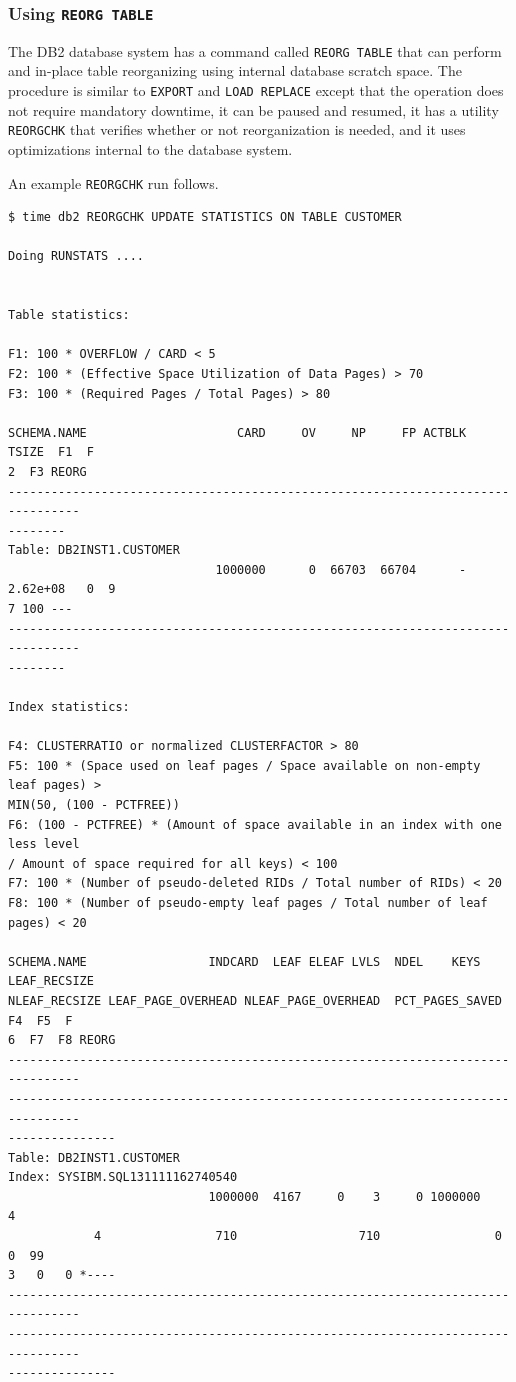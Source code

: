 \documentclass[letterpaper]{article}%
\begin{document}
\subsubsection{Using \texttt{REORG TABLE}}

The DB2 database system has a command called \texttt{REORG TABLE} that can
perform and in-place table reorganizing using internal database scratch space.
The procedure is similar to \texttt{EXPORT} and \texttt{LOAD REPLACE} except
that the operation does not require mandatory downtime, it can be paused and
resumed, it has a utility \texttt{REORGCHK} that verifies whether or not
reorganization is needed, and it uses optimizations internal to the database
system.

An example \texttt{REORGCHK} run follows.
\begin{Verbatim}[frame=single]
$ time db2 REORGCHK UPDATE STATISTICS ON TABLE CUSTOMER

Doing RUNSTATS ....


Table statistics:

F1: 100 * OVERFLOW / CARD < 5
F2: 100 * (Effective Space Utilization of Data Pages) > 70
F3: 100 * (Required Pages / Total Pages) > 80

SCHEMA.NAME                     CARD     OV     NP     FP ACTBLK    TSIZE  F1  F
2  F3 REORG
--------------------------------------------------------------------------------
--------
Table: DB2INST1.CUSTOMER
                             1000000      0  66703  66704      - 2.62e+08   0  9
7 100 ---
--------------------------------------------------------------------------------
--------

Index statistics:

F4: CLUSTERRATIO or normalized CLUSTERFACTOR > 80
F5: 100 * (Space used on leaf pages / Space available on non-empty leaf pages) >
MIN(50, (100 - PCTFREE))
F6: (100 - PCTFREE) * (Amount of space available in an index with one less level
/ Amount of space required for all keys) < 100
F7: 100 * (Number of pseudo-deleted RIDs / Total number of RIDs) < 20
F8: 100 * (Number of pseudo-empty leaf pages / Total number of leaf pages) < 20

SCHEMA.NAME                 INDCARD  LEAF ELEAF LVLS  NDEL    KEYS LEAF_RECSIZE 
NLEAF_RECSIZE LEAF_PAGE_OVERHEAD NLEAF_PAGE_OVERHEAD  PCT_PAGES_SAVED  F4  F5  F
6  F7  F8 REORG
--------------------------------------------------------------------------------
--------------------------------------------------------------------------------
---------------
Table: DB2INST1.CUSTOMER
Index: SYSIBM.SQL131111162740540
                            1000000  4167     0    3     0 1000000            4 
            4                710                 710                0   0  99   
3   0   0 *----
--------------------------------------------------------------------------------
--------------------------------------------------------------------------------
---------------


\end{Verbatim}
\end{document}

